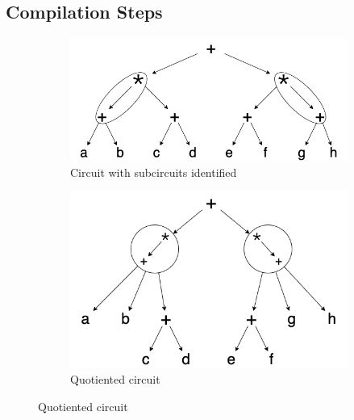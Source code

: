 \subsection{Compilation Steps}
\begin{figure}
    \begin{subfigure}{0.45\columnwidth}
        \includegraphics[width=0.9\linewidth]{figures/compilation_overview/running_example_quotiented.drawio.png}
        \caption{Circuit with subcircuits identified}
        \label{fig:subcircuits-identified}
    \end{subfigure}
    \begin{subfigure}{0.45\columnwidth}
        \includegraphics[width=0.9\linewidth]{figures/compilation_overview/running_example_identified.drawio.png}
        \caption{Quotiented circuit}
        \label{fig:quotiented-circuit}
        

\end{subfigure}
\end{figure}
